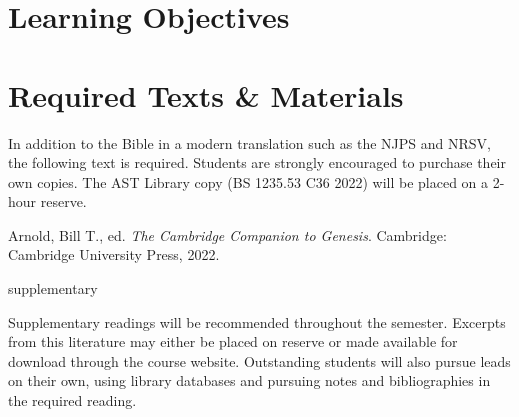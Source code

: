 \documentclass[titlepage]{article}
\newcommand\incl{../includes}
\begin{document}


\section{Learning Objectives}
\label{objectives}
\edobject

\section{Required Texts \& Materials}
\label{texts}

In addition to the Bible in a modern translation such as the NJPS and
NRSV, the following text is required. Students are strongly encouraged
to purchase their own copies. The AST Library copy ({\scshape BS 1235.53
C36 2022}) will be placed on a 2-hour reserve.

\begingroup
\renewcommand{\section}[2]{}%
\begin{thebibliography}{CCG}%

	 Arnold, Bill T., ed.
	\emph{The Cambridge Companion to Genesis}.
	Cambridge: Cambridge University Press, 2022.



\end{thebibliography}
\endgroup

\section{Supplementary Texts}
\label{supplementary}

Supplementary readings will be recommended throughout the semester.
Excerpts from this literature may either be placed on reserve or made
available for download through the course website. Outstanding students
will also pursue leads on their own, using library databases and
pursuing notes and bibliographies in the required reading.
\end{document}
